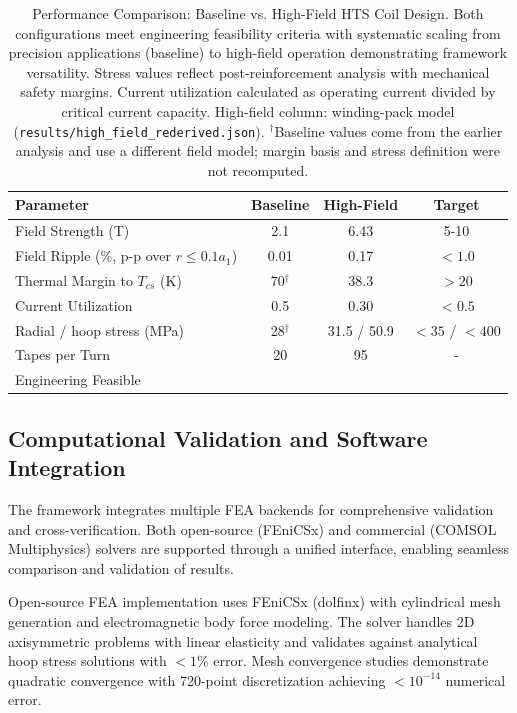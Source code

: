 \documentclass[aps,prb,preprint,amsmath,amssymb]{revtex4-2}
\providecommand{\checkmark}{\ding{51}}
\begin{document}
\begin{table}[h]
\centering
\caption{Performance Comparison: Baseline vs. High-Field HTS Coil Design. Both configurations meet engineering feasibility criteria with systematic scaling from precision applications (baseline) to high-field operation demonstrating framework versatility. Stress values reflect post-reinforcement analysis with mechanical safety margins. Current utilization calculated as operating current divided by critical current capacity. High-field column: winding-pack model (\texttt{results/high\_field\_rederived.json}). $^\dagger$Baseline values come from the earlier analysis and use a different field model; margin basis and stress definition were not recomputed.}
\begin{tabular}{|l|c|c|c|}
\hline
\textbf{Parameter} & \textbf{Baseline} & \textbf{High-Field} & \textbf{Target} \\
\hline
Field Strength (T) & 2.1 & 6.43 & 5-10 \\
Field Ripple (\%, p-p over $r\le0.1a_1$) & 0.01 & 0.17 & $<1.0$ \\
Thermal Margin to $T_{cs}$ (K) & 70$^\dagger$ & 38.3 & $>20$ \\
Current Utilization & 0.5 & 0.30 & $<0.5$ \\
Radial / hoop stress (MPa) & 28$^\dagger$ & 31.5 / 50.9 & $<35$ / $<400$ \\
Tapes per Turn & 20 & 95 & - \\
Engineering Feasible & \checkmark & \checkmark & \checkmark \\
\hline
\end{tabular}
\label{tab:comparison}
\end{table}

\subsection{Computational Validation and Software Integration}

The framework integrates multiple FEA backends for comprehensive validation and cross-verification. Both open-source (FEniCSx) and commercial (COMSOL Multiphysics) solvers are supported through a unified interface, enabling seamless comparison and validation of results.

Open-source FEA implementation uses FEniCSx (dolfinx) with cylindrical mesh generation and electromagnetic body force modeling. The solver handles 2D axisymmetric problems with linear elasticity and validates against analytical hoop stress solutions with $<1\%$ error. Mesh convergence studies demonstrate quadratic convergence with 720-point discretization achieving $<10^{-14}$ numerical error.
\end{document}
